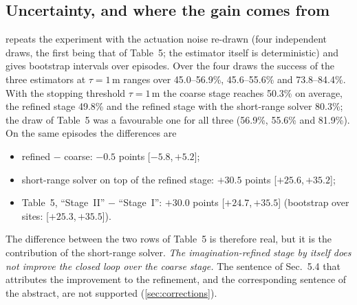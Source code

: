 \documentclass[10pt,twocolumn,letterpaper]{article}
\newcommand{\ci}[2]{{\scriptsize[\ensuremath{#1},\,\ensuremath{#2}]}}
\begin{document}
\begin{table}[t]
\centering
\caption{\textbf{Without a stopping rule}: share of the episodes of \cref{tab:closedloop} within 1\,m of the goal after each step (\%, mean over the draws), and median position error after the fifth step.}
\label{tab:fixedsteps}
\footnotesize
\setlength{\tabcolsep}{4pt}
\end{table}

\subsection{Uncertainty, and where the gain comes from}
\label{sec:cluncertainty}

 repeats the experiment with the actuation noise re-drawn (four independent draws, the first being that of Table~5; the estimator itself is deterministic) and gives bootstrap intervals over episodes. Over the four draws the success of the three estimators at $\tau{=}1$\,m ranges over 45.0--56.9\%, 45.6--55.6\% and 73.8--84.4\%.{} With the stopping threshold $\tau{=}1$\,m the coarse stage reaches 50.3\% on average, the refined stage 49.8\% and the refined stage with the short-range solver 80.3\%; the draw of Table~5 was a favourable one for all three (56.9\%, 55.6\% and 81.9\%). On the same episodes the differences are
\begin{itemize}[leftmargin=*,itemsep=1pt,topsep=2pt]
\item refined $-$ coarse: \ensuremath{-0.5}{} points \ci{\ensuremath{-5.8}}{\ensuremath{+5.2}};
\item short-range solver on top of the refined stage: \ensuremath{+30.5}{} points \ci{\ensuremath{+25.6}}{\ensuremath{+35.2}};
\item Table~5, ``Stage~II'' $-$ ``Stage~I'': \ensuremath{+30.0}{} points \ci{\ensuremath{+24.7}}{\ensuremath{+35.5}} (bootstrap over sites: \ci{\ensuremath{+25.3}}{\ensuremath{+35.5}}).
\end{itemize}
The difference between the two rows of Table~5 is therefore real, but it is the contribution of the short-range solver. \emph{The imagination-refined stage by itself does not improve the closed loop over the coarse stage.} The sentence of Sec.~5.4 that attributes the improvement to the refinement, and the corresponding sentence of the abstract, are not supported (\cref{sec:corrections}).
\end{document}
